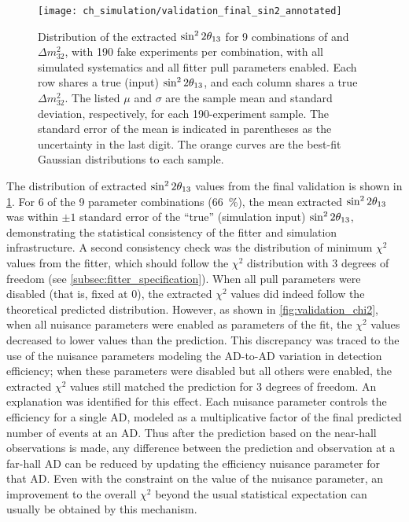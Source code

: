 \begin{figure}
    \centering
    \texttt{[image: ch\_simulation/validation\_final\_sin2\_annotated]}
    \caption[Fitter validation results]{
        Distribution of the extracted $\sin^22\theta_{13}{}$
        for 9 combinations of \thetaot{} and $\Delta m^2_{32}${},
        with 190 fake experiments per combination,
        with all simulated systematics and all fitter pull parameters enabled.
        Each row shares a true (input) $\sin^22\theta_{13}{}$,
        and each column shares a true $\Delta m^2_{32}$.
        The listed $\mu$ and $\sigma$ are the sample mean and standard deviation,
        respectively, for each 190-experiment sample.
        The standard error of the mean is indicated in parentheses
        as the uncertainty in the last digit.
        The orange curves are the best-fit Gaussian distributions
        to each sample.
    }
    \label{fig:final_validation}
\end{figure}

The distribution of extracted $\sin^22\theta_{13}$ values from the final validation
is shown in \cref{fig:final_validation}.
For 6 of the 9 parameter combinations (\SI{66}{\percent}),
the mean extracted $\sin^22\theta_{13}$
was within $\pm1$ standard error of the ``true'' (simulation input) $\sin^22\theta_{13}$,
demonstrating the statistical consistency of the fitter and simulation infrastructure.
A second consistency check was the distribution of minimum $\chi^2$ values
from the fitter,
which should follow the $\chi^2$ distribution with 3 degrees of freedom
(see \cref{subsec:fitter_specification}).
When all pull parameters were disabled (that is, fixed at 0), the extracted $\chi^2$ values
did indeed follow the theoretical predicted distribution.
However, as shown in \cref{fig:validation_chi2},
when all nuisance parameters were enabled as parameters of the fit,
the $\chi^2$ values decreased to lower values than the prediction.
This discrepancy was traced to the use of the nuisance parameters
modeling the AD-to-AD variation in detection efficiency;
when these parameters were disabled but all others were enabled,
the extracted $\chi^2$ values still matched the prediction for 3 degrees of freedom.
An explanation was identified for this effect.
Each nuisance parameter controls the efficiency for a single AD,
modeled as a multiplicative factor of the final predicted number of events at an AD.
Thus after the prediction based on the near-hall observations is made,
any difference between the prediction and observation at a far-hall AD
can be reduced by updating the efficiency nuisance parameter for that AD.
Even with the constraint on the value of the nuisance parameter,
an improvement to the overall $\chi^2$
beyond the usual statistical expectation
can usually be obtained by this mechanism.

